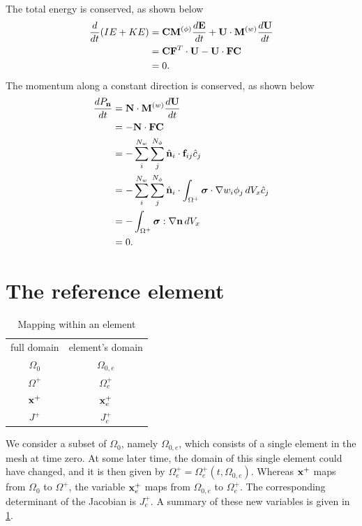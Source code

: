 \documentclass[11pt]{article}
\begin{document}
The total energy is conserved, as shown below
\begin{align}
    \frac{d}{dt} (IE + KE) &= \mathbf{C} \mathbf{M}^{(\phi)} \frac{d\mathbf{E}}{dt} + \mathbf{U} \cdot \mathbf{M}^{(w)} \frac{d\mathbf{U}}{dt} \nonumber \\
    &= \mathbf{C} \mathbf{F}^T \cdot \mathbf{U} - \mathbf{U} \cdot \mathbf{F} \mathbf{C} \nonumber \\
    &= 0.
\end{align}
The momentum along a constant direction is conserved, as shown below
\begin{align}
    \frac{d P_{\mathbf{n}}}{dt} &= \mathbf{N} \cdot \mathbf{M}^{(w)} \frac{d \mathbf{U}}{dt} \nonumber \\
    &= -\mathbf{N} \cdot \mathbf{F} \mathbf{C} \nonumber \\
    &= -\sum_i^{N_w} \sum_j^{N_\phi} \hat{\mathbf{n}}_i \cdot \mathbf{f}_{ij} \hat{c}_j \nonumber \\
    &= -\sum_i^{N_w} \sum_j^{N_\phi} \hat{\mathbf{n}}_i \cdot \int_{\Omega^+} \bm \sigma \cdot \nabla w_i \phi_j \, dV_x \hat{c}_j \nonumber \\
    &= -\int_{\Omega^+} \bm \sigma : \nabla \mathbf{n} \, dV_x \nonumber \\
    &= 0.
\end{align}

\section{The reference element}
\begin{table}
    \centering
    \begin{tabular}{c|c}
          full domain & element's domain \\
          \hhline{=|=}
          $\Omega_0$ & $\Omega_{0,e}$ \\
          $\Omega^+$ & $\Omega^+_e$ \\
          $\mathbf{x}^+$ & $\mathbf{x}^+_e$ \\
          $J^+$ & $J^+_e$
    \end{tabular}
    \caption{Mapping within an element}
    \label{tab:map_element}
\end{table}
We consider a subset of $\Omega_0$, namely $\Omega_{0,e}$, which consists of a single element in the mesh at time zero. At some later time, the domain of this single element could have changed, and it is then given by $\Omega^+_e = \Omega^+_e(t,\Omega_{0,e})$. Whereas $\mathbf{x}^+$ maps from $\Omega_0$ to $\Omega^+$, the variable $\mathbf{x}^+_e$ maps from $\Omega_{0,e}$ to $\Omega^+_e$. The corresponding determinant of the Jacobian is $J^+_e$. A summary of these new variables is given in \cref{tab:map_element}.
\end{document}
